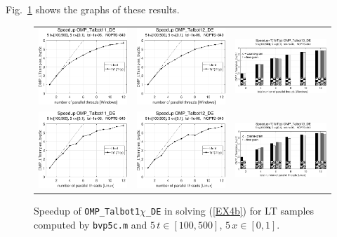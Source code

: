 \documentclass[a4paper,10pt]{report}%
\begin{document}
Fig.~\ref{PAR_EX4b_speedup_bvp5c} shows the graphs of these results.
\begin{figure}[htb]
\centering
\begin{tabular}{ccc} %
\includegraphics[height=0.2\textwidth]{./FIGS/EX4b/EX4b_bvp5c_speedup_11_5t_100_Windows.eps} &
\includegraphics[height=0.2\textwidth]{./FIGS/EX4b/EX4b_bvp5c_speedup_12_5t_100_Windows.eps} &
\includegraphics[height=0.2\textwidth,keepaspectratio=true]{./FIGS/EX4b/EX4b_bvp5c_speedup_13_5t_100_Windows.eps} \\
\includegraphics[height=0.2\textwidth]{./FIGS/EX4b/EX4b_bvp5c_speedup_11_5t_100_Linux.eps} &
\includegraphics[height=0.2\textwidth]{./FIGS/EX4b/EX4b_bvp5c_speedup_12_5t_100_Linux.eps} &
\includegraphics[height=0.2\textwidth,keepaspectratio=true]{./FIGS/EX4b/EX4b_bvp5c_speedup_13_5t_100_Linux.eps}
\end{tabular}
\caption{\small Speedup of {\tt OMP\_Talbot1$\chi$\_DE} in solving (\ref{EX4b}) for LT samples computed
by {\tt bvp5c.m} and $5\,t\in[100,500]$, $5\,x\in[0,1]$.}
\label{PAR_EX4b_speedup_bvp5c}
\end{figure}
\end{document}

